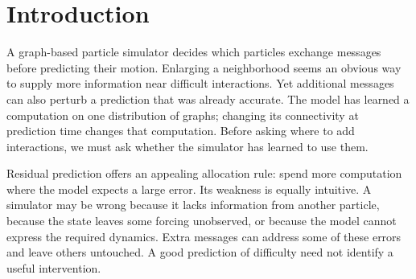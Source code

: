 
\begin{abstract}
More messages do not automatically make a better particle simulator. They change the computation of a model trained on a particular interaction graph. We construct adaptive graphs that preserve native edges and append an exact budget of nearby pairs, then study how the simulator learns to use these messages and where a controller should place them. Mixed-graph training exposes the model to random expansions; cached residual scores allocate pairs with one simulator pass per forecast after initialization. Three-seed studies on Goop, WaterDrop and Sand, with paired continuations for WaterDrop, reveal different answers to these two questions. Exposure improves fixed-random rollout error in every Goop and WaterDrop seed, reducing Goop mean MSE from 0.301 to 0.129. Residual-guided placement is less reliable. On Sand, exposure lowers observed-history error under risk-guided allocation while worsening cached-risk rollout error in every seed. Prediction difficulty therefore differs from the benefit of an added interaction, and a favorable comparison on observed states need not survive autonomous feedback. These distinctions provide a practical basis for constructing and evaluating adaptive particle graphs.
\end{abstract}

\section{Introduction}
A graph-based particle simulator decides which particles exchange messages before predicting their motion\citep{sanchez2020}. Enlarging a neighborhood seems an obvious way to supply more information near difficult interactions. Yet additional messages can also perturb a prediction that was already accurate. The model has learned a computation on one distribution of graphs; changing its connectivity at prediction time changes that computation. Before asking where to add interactions, we must ask whether the simulator has learned to use them.

Residual prediction offers an appealing allocation rule: spend more computation where the model expects a large error. Its weakness is equally intuitive. A simulator may be wrong because it lacks information from another particle, because the state leaves some forcing unobserved, or because the model cannot express the required dynamics. Extra messages can address some of these errors and leave others untouched. A good prediction of difficulty need not identify a useful intervention.


